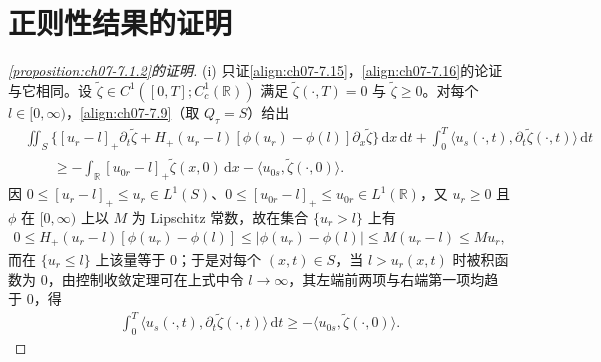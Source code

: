 \documentclass[../../main.tex]{subfiles}%
\begin{document}
\section{正则性结果的证明}\label{section:ch07-正则证明}

\begin{proof}[\cref{proposition:ch07-7.1.2}的证明]
(i) 只证\eqref{align:ch07-7.15}，\eqref{align:ch07-7.16}的论证与它相同。设 $\widetilde\zeta\in C^1([0,T];C_c^1(\mathbb{R}))$ 满足 $\widetilde\zeta(\cdot,T)=0$ 与 $\widetilde\zeta\geqslant0$。对每个 $l\in[0,\infty)$，\eqref{align:ch07-7.9}（取 $Q_\tau=S$）给出
\begin{align*}
&\iint_S\{[u_r-l]_+\partial_t\widetilde\zeta+H_+(u_r-l)[\phi(u_r)-\phi(l)]\partial_x\widetilde\zeta\}\,\mathrm{d}x\,\mathrm{d}t
+\int_0^T\langle u_s(\cdot,t),\partial_t\widetilde\zeta(\cdot,t)\rangle\,\mathrm{d}t\\
&\qquad\geqslant-\int_\mathbb{R}[u_{0r}-l]_+\widetilde\zeta(x,0)\,\mathrm{d}x-\langle u_{0s},\widetilde\zeta(\cdot,0)\rangle .
\end{align*}
因 $0\leqslant[u_r-l]_+\leqslant u_r\in L^1(S)$、$0\leqslant[u_{0r}-l]_+\leqslant u_{0r}\in L^1(\mathbb{R})$，又 $u_r\geqslant0$ 且 $\phi$ 在 $[0,\infty)$ 上以 $M$ 为 Lipschitz 常数，故在集合 $\{u_r>l\}$ 上有
\begin{align*}
0\leqslant H_+(u_r-l)[\phi(u_r)-\phi(l)]\leqslant|\phi(u_r)-\phi(l)|\leqslant M(u_r-l)\leqslant Mu_r,
\end{align*}
而在 $\{u_r\leqslant l\}$ 上该量等于 $0$；于是对每个 $(x,t)\in S$，当 $l>u_r(x,t)$ 时被积函数为 $0$，由控制收敛定理可在上式中令 $l\to\infty$，其左端前两项与右端第一项均趋于 $0$，得
\begin{align}
\int_0^T\langle u_s(\cdot,t),\partial_t\widetilde\zeta(\cdot,t)\rangle\,\mathrm{d}t\geqslant-\langle u_{0s},\widetilde\zeta(\cdot,0)\rangle . \label{align:ch07-7.157}
\end{align}


\end{proof}
\end{document}
